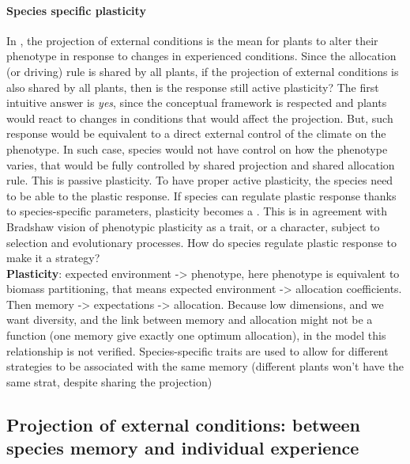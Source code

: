 \paragraph{Species specific plasticity}
In \model, the projection of external conditions is the mean for plants to alter their phenotype in response to changes in experienced conditions. Since the allocation (or driving) rule is shared by all plants, if the projection of external conditions is also shared by all plants, then is the response still active plasticity? The first intuitive answer is \textit{yes}, since the conceptual framework is respected and plants would react to changes in conditions that would affect the projection. But, such response would be equivalent to a direct external control of the climate on the phenotype. In such case, species would not have control on how the phenotype varies, that would be fully controlled by shared projection and shared allocation rule. This is passive plasticity. To have proper active plasticity, the species need to be able to  the plastic response. If species can regulate plastic response thanks to species-specific parameters, plasticity becomes a . This is in agreement with Bradshaw vision of phenotypic plasticity as a trait, or a character, subject to selection and evolutionary processes\parencite{bradshaw_evolutionary_1965, bradshaw_unravelling_2006}. How do species regulate plastic response to make it a strategy?\\

\textbf{Plasticity}: expected environment -> phenotype, here phenotype is equivalent to biomass partitioning, that means expected environment -> allocation coefficients. Then memory -> expectations -> allocation. Because low dimensions, and we want diversity, and the link between memory and allocation might not be a function (one memory give exactly one optimum allocation), in the model this relationship is not verified. Species-specific traits are used to allow for different strategies to be associated with the same memory (different plants won't have the same strat, despite sharing the projection)\\


\subsection{Projection of external conditions: between species memory and individual experience}

